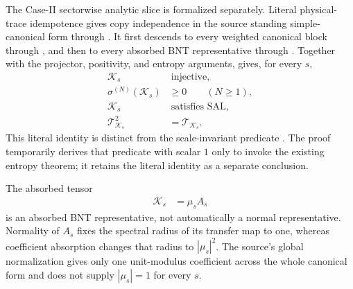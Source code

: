 \documentclass{article}
\begin{document}
The Case-II sectorwise analytic slice is formalized separately. Literal
physical-trace idempotence gives copy independence in the source standing
simple-canonical form through
. It
first descends to every weighted canonical block through
, and then
to every absorbed BNT representative through
.
Together with the projector, positivity, and entropy arguments,
gives, for every $s$,
\begin{align}
    \mathcal K_s
        &\ \text{injective},
    \label{eq:cpgsv17_caseii_absorbed_injective}\\
    \sigma^{(N)}(\mathcal K_s)
        &\geq 0
        \qquad (N\geq 1),
    \label{eq:cpgsv17_caseii_periodic_positive}\\
    \mathcal K_s
        &\ \text{satisfies SAL},
    \label{eq:cpgsv17_caseii_absorbed_sal}\\
    \mathcal T_{\mathcal K_s}^2
        &= \mathcal T_{\mathcal K_s}.
    \label{eq:cpgsv17_caseii_literal_transfer_idempotence}
\end{align}
This literal identity is distinct from the scale-invariant predicate
. The proof temporarily derives that predicate
with scalar $1$ only to invoke the existing entropy theorem; it retains the
literal identity as a separate conclusion.

The absorbed tensor
\begin{align}
    \mathcal K_s
        &= \mu_sA_s
    \label{eq:cpgsv17_absorbed_bnt_representative}
\end{align}
is an absorbed BNT representative, not automatically a normal representative.
Normality of $A_s$ fixes the spectral radius of its transfer map to one,
whereas coefficient absorption changes that radius to $|\mu_s|^2$. The
source's global normalization gives only one unit-modulus coefficient across
the whole canonical form and does not supply $|\mu_s|=1$ for every $s$.
\end{document}
